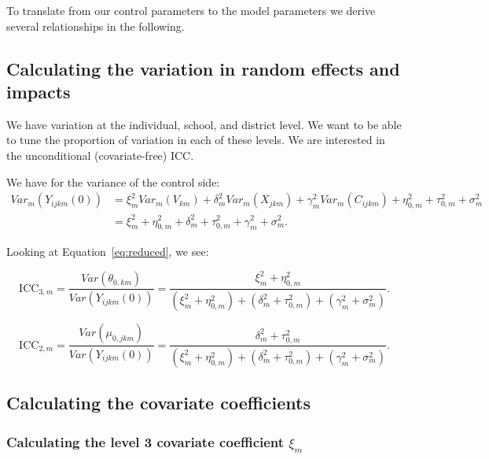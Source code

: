 \documentclass[12pt]{article}
\begin{document}
To translate from our control parameters to the model parameters we derive several relationships in the following.


\subsection{Calculating the variation in random effects and impacts}

We have variation at the individual, school, and district level.
We want to be able to tune the proportion of variation in each of these levels.
We are interested in the unconditional (covariate-free) ICC.

We have for the variance of the control side:
\begin{align*}
Var_m( Y_{ijkm}(0) ) &= \xi_m^2 Var_m(V_{km}) + \delta_m^2 Var_m(X_{jkm}) + \gamma_m^2 Var_m(C_{ijkm}) + \eta^2_{0,m} + \tau^2_{0,m} + \sigma^2_m \\
&=  \xi_m^2 +  \eta^2_{0,m} + \delta_m^2  + \tau^2_{0,m} + \gamma_m^2 + \sigma^2_m.
\end{align*}

Looking at Equation~\ref{eq:reduced}, we see:

\[ \text{ICC}_{3,m} = \frac{Var(\theta_{0,km})}{ Var(Y_{ijkm}(0))} = \frac{\xi^2_m + \eta_{0,m}^2}{\left(\xi_m^2 +  \eta^2_{0,m}\right) + \left(\delta_m^2  + \tau^2_{0,m}\right) + \left(\gamma_m^2 + \sigma^2_m\right)}.\]

\[ \text{ICC}_{2,m} = \frac{Var(\mu_{0,jkm})}{ Var(Y_{ijkm}(0))} = \frac{\delta_m^2  + \tau_{0,m}^2}{\left(\xi_m^2 +  \eta^2_{0,m}\right) + \left(\delta_m^2  + \tau^2_{0,m}\right) + \left(\gamma_m^2 + \sigma^2_m\right)} .\]


\subsection{Calculating the covariate coefficients}

\subsubsection{Calculating the level 3 covariate coefficient $\xi_m$}
\end{document}
